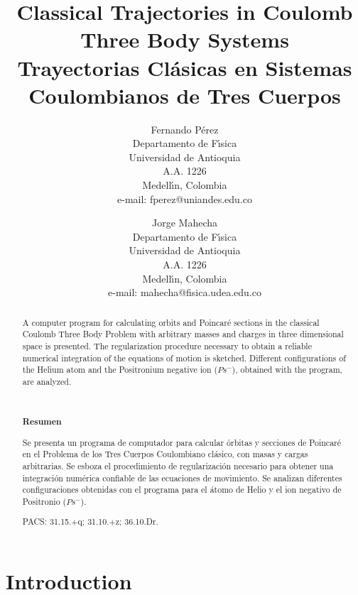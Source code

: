\documentclass[thmsa]{article}
\begin{document}
\title{Classical Trajectories in Coulomb Three Body Systems\\
Trayectorias Cl\'asicas en Sistemas Coulombianos de Tres Cuerpos}
\author{Fernando P\'erez \\
Departamento de F\'\i sica\\
Universidad de Antioquia\\
A.A. 1226\\
Medell\'\i n, Colombia\\
e-mail: fperez@uniandes.edu.co \and Jorge Mahecha \\
Departamento de F\'\i sica\\
Universidad de Antioquia\\
A.A. 1226\\
Medell\'\i n, Colombia\\
e-mail: mahecha@fisica.udea.edu.co}
\date{}
\maketitle

\begin{abstract}
A computer program for calculating orbits and Poincar\'e sections in the
classical Coulomb Three Body Problem with arbitrary masses and charges in
three dimensional space is presented. The regularization procedure necessary
to obtain a reliable numerical integration of the equations of motion is
sketched. Different configurations of the Helium atom and the Positronium
negative ion ($Ps^{-}$), obtained with the program, are analyzed.

\medskip\ 

\begin{center}
\textbf{Resumen}
\end{center}

Se presenta un programa de computador para calcular \'orbitas y secciones de
Poincar\'e en el Problema de los Tres Cuerpos Coulombiano cl\'asico, con
masas y cargas arbitrarias. Se esboza el procedimiento de regularizaci\'on
necesario para obtener una integraci\'on num\'erica confiable de las
ecuaciones de movimiento. Se analizan diferentes configuraciones obtenidas
con el programa para el \'atomo de Helio y el ion negativo de Positronio ($%
Ps^{-}$).

PACS: 31.15.+q; 31.10.+z; 36.10.Dr.
\end{abstract}

\section{Introduction}
\end{document}
